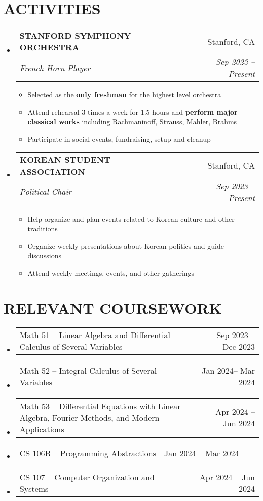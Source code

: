\documentclass[letterpaper,11pt]{article}
\makeatletter
\newcommand{\resumeItem}[1]{
  \item\small{
    {#1 \vspace{-4pt}}
  }
}
\newcommand{\resumeSubheading}[4]{
  \vspace{-3pt}\item
    \begin{tabular*}{0.97\textwidth}[t]{l@{\extracolsep{\fill}}r}
      \vspace{-2pt}
      \textbf{#1} & \small#2 \\
      \textit{\small#3} & \textit{\small #4} \\
    \end{tabular*}\vspace{-10pt}
}
\newcommand{\resumeCourse}[2]{
  \vspace{-3pt}\item
    \begin{tabular*}{0.97\textwidth}[t]{l@{\extracolsep{\fill}}r}
      \vspace{-2pt}
      \small#1 & \small #2 \\
    \end{tabular*}\vspace{-8pt}
}
\newcommand{\resumeSubHeadingListStart}{\begin{itemize}[leftmargin=0in, label={}]}
\newcommand{\resumeSubHeadingListEnd}{\end{itemize}}
\newcommand{\resumeItemListStart}{\begin{itemize}[leftmargin=0.2in]}
\newcommand{\resumeItemListEnd}{\end{itemize}\vspace{-5pt}}
\makeatother
\begin{document}
  \section{\textbf{ACTIVITIES}}
  \resumeSubHeadingListStart

    \resumeSubheading
      {STANFORD SYMPHONY ORCHESTRA}{Stanford, CA}
      {French Horn Player}{Sep 2023 -- Present}
      \resumeItemListStart
      \resumeItem{Selected as the \textbf{only freshman} for the highest level orchestra}
      \resumeItem{Attend rehearsal 3 times a week for 1.5 hours and \textbf{perform major classical works} including Rachmaninoff, Strauss, Mahler, Brahms}
        \resumeItem{Participate in social events, fundraising, setup and cleanup}
      \resumeItemListEnd
      
    \resumeSubheading
      {KOREAN STUDENT ASSOCIATION}{Stanford, CA}
      {Political Chair}{Sep 2023 -- Present}
      \resumeItemListStart
        \resumeItem{Help organize and plan events related to Korean culture and other traditions}
        \resumeItem{Organize weekly presentations about Korean politics and guide discussions}
        \resumeItem{Attend weekly meetings, events, and other gatherings}
        \resumeItemListEnd
        \vspace{-4pt}
  \resumeSubHeadingListEnd

  \section{\textbf{RELEVANT COURSEWORK}}
  \resumeSubHeadingListStart
    \resumeCourse {Math 51 -- Linear Algebra and Differential Calculus of Several Variables}{Sep 2023 -- Dec 2023}
    \resumeCourse {Math 52 -- Integral Calculus of Several Variables}{Jan 2024-- Mar 2024}
    \resumeCourse {Math 53 -- Differential Equations with Linear Algebra, Fourier Methods, and Modern Applications}{Apr 2024 -- Jun 2024}
    \resumeCourse {CS 106B -- Programming Abstractions}{Jan 2024 -- Mar 2024}
    \resumeCourse {CS 107 -- Computer Organization and Systems}{Apr 2024 -- Jun 2024}
    \vspace{-2pt}
  \resumeSubHeadingListEnd

\end{document}
